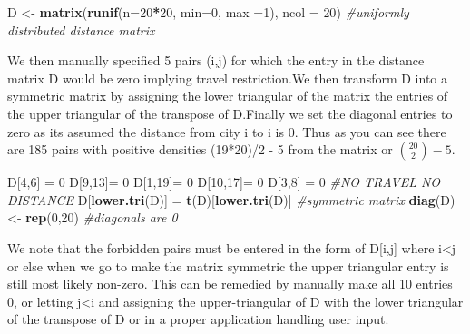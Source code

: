 \documentclass[
]{article}
\newenvironment{Shaded}{\begin{snugshade}}{\end{snugshade}}
\newcommand{\CommentTok}[1]{\textcolor[rgb]{0.56,0.35,0.01}{\textit{#1}}}
\newcommand{\DataTypeTok}[1]{\textcolor[rgb]{0.13,0.29,0.53}{#1}}
\newcommand{\DecValTok}[1]{\textcolor[rgb]{0.00,0.00,0.81}{#1}}
\newcommand{\KeywordTok}[1]{\textcolor[rgb]{0.13,0.29,0.53}{\textbf{#1}}}
\newcommand{\NormalTok}[1]{#1}
\newcommand{\OperatorTok}[1]{\textcolor[rgb]{0.81,0.36,0.00}{\textbf{#1}}}
\newcommand{\StringTok}[1]{\textcolor[rgb]{0.31,0.60,0.02}{#1}}
\begin{document}
\begin{Shaded}
\begin{Highlighting}[]
\NormalTok{D <-}\StringTok{ }\KeywordTok{matrix}\NormalTok{(}\KeywordTok{runif}\NormalTok{(}\DataTypeTok{n=}\DecValTok{20}\OperatorTok{*}\DecValTok{20}\NormalTok{, }\DataTypeTok{min=}\DecValTok{0}\NormalTok{, }\DataTypeTok{max =}\DecValTok{1}\NormalTok{), }\DataTypeTok{ncol =} \DecValTok{20}\NormalTok{) }\CommentTok{#uniformly distributed distance matrix}
\end{Highlighting}
\end{Shaded}

We then manually specified 5 pairs (i,j) for which the entry in the
distance matrix D would be zero implying travel restriction.We then
transform D into a symmetric matrix by assigning the lower triangular of
the matrix the entries of the upper triangular of the transpose of
D.Finally we set the diagonal entries to zero as its assumed the
distance from city i to i is 0. Thus as you can see there are 185 pairs
with positive densities (19*20)/2 - 5 from the matrix or
\({20 \choose 2}-5\).

\begin{Shaded}
\begin{Highlighting}[]
\NormalTok{D[}\DecValTok{4}\NormalTok{,}\DecValTok{6}\NormalTok{] =}\StringTok{ }\DecValTok{0}
\NormalTok{D[}\DecValTok{9}\NormalTok{,}\DecValTok{13}\NormalTok{]=}\StringTok{ }\DecValTok{0}
\NormalTok{D[}\DecValTok{1}\NormalTok{,}\DecValTok{19}\NormalTok{]=}\StringTok{ }\DecValTok{0} 
\NormalTok{D[}\DecValTok{10}\NormalTok{,}\DecValTok{17}\NormalTok{]=}\StringTok{ }\DecValTok{0}  
\NormalTok{D[}\DecValTok{3}\NormalTok{,}\DecValTok{8}\NormalTok{] =}\StringTok{ }\DecValTok{0} \CommentTok{#NO TRAVEL NO DISTANCE}
\NormalTok{D[}\KeywordTok{lower.tri}\NormalTok{(D)] =}\StringTok{ }\KeywordTok{t}\NormalTok{(D)[}\KeywordTok{lower.tri}\NormalTok{(D)] }\CommentTok{#symmetric matrix}
\KeywordTok{diag}\NormalTok{(D) <-}\StringTok{ }\KeywordTok{rep}\NormalTok{(}\DecValTok{0}\NormalTok{,}\DecValTok{20}\NormalTok{) }\CommentTok{#diagonals are 0}
\end{Highlighting}
\end{Shaded}

We note that the forbidden pairs must be entered in the form of
D{[}i,j{]} where i\textless j or else when we go to make the matrix
symmetric the upper triangular entry is still most likely non-zero. This
can be remedied by manually make all 10 entries 0, or letting
j\textless i and assigning the upper-triangular of D with the lower
triangular of the transpose of D or in a proper application handling
user input.
\end{document}
